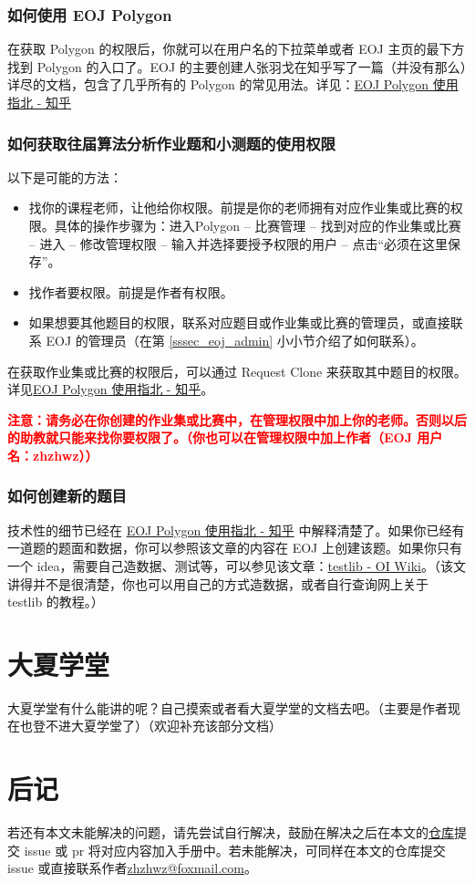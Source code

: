 \documentclass{article}
\begin{document}
\subsubsection{如何使用 EOJ Polygon}

在获取 Polygon 的权限后，你就可以在用户名的下拉菜单或者 EOJ 主页的最下方找到 Polygon 的入口了。EOJ 的主要创建人张羽戈在知乎写了一篇（并没有那么）详尽的文档，包含了几乎所有的 Polygon 的常见用法。详见：\href{https://zhuanlan.zhihu.com/p/59869879}{EOJ Polygon 使用指北 - 知乎}

\subsubsection{如何获取往届算法分析作业题和小测题的使用权限}

以下是可能的方法：

\begin{itemize}
    \item 找你的课程老师，让他给你权限。前提是你的老师拥有对应作业集或比赛的权限。具体的操作步骤为：进入Polygon -- 比赛管理 -- 找到对应的作业集或比赛 -- 进入 -- 修改管理权限 -- 输入并选择要授予权限的用户 -- 点击``必须在这里保存''。
    \item 找作者要权限。前提是作者有权限。
    \item 如果想要其他题目的权限，联系对应题目或作业集或比赛的管理员，或直接联系 EOJ 的管理员（在第 \ref{sssec_eoj_admin} 小小节介绍了如何联系）。
\end{itemize}

在获取作业集或比赛的权限后，可以通过 Request Clone 来获取其中题目的权限。详见\href{https://zhuanlan.zhihu.com/p/59869879}{EOJ Polygon 使用指北 - 知乎}。

\textbf{\textcolor{red}{注意：请务必在你创建的作业集或比赛中，在管理权限中加上你的老师。否则以后的助教就只能来找你要权限了。（你也可以在管理权限中加上作者（EOJ 用户名：zhzhwz））}}

\subsubsection{如何创建新的题目}

技术性的细节已经在 \href{https://zhuanlan.zhihu.com/p/59869879}{EOJ Polygon 使用指北 - 知乎} 中解释清楚了。如果你已经有一道题的题面和数据，你可以参照该文章的内容在 EOJ 上创建该题。如果你只有一个 idea，需要自己造数据、测试等，可以参见该文章：\href{https://oi-wiki.org/tools/testlib/}{testlib - OI Wiki}。（该文讲得并不是很清楚，你也可以用自己的方式造数据，或者自行查询网上关于 testlib 的教程。）

\section{大夏学堂}

大夏学堂有什么能讲的呢？自己摸索或者看大夏学堂的文档去吧。（主要是作者现在也登不进大夏学堂了）（欢迎补充该部分文档）

\section{后记}

若还有本文未能解决的问题，请先尝试自行解决，鼓励在解决之后在本文的\href{https://github.com/zhzhwz/AlgorithmTAManual}{仓库}提交 issue 或 pr 将对应内容加入手册中。若未能解决，可同样在本文的仓库提交 issue 或直接联系作者\href{mailto:zhzhwz@foxmail.com}{zhzhwz@foxmail.com}。 
\end{document}
